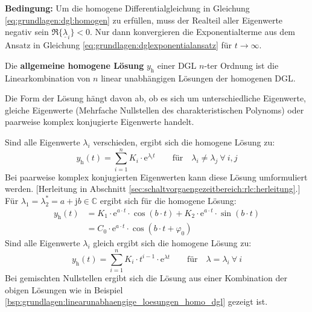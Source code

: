 \begin{frame}
{    %
    \textbf{Bedingung:} Um die homogene Differentialgleichung in Gleichung \ref{eq:grundlagen:dgl:homogen} 
    zu erfüllen, muss der Realteil aller Eigenwerte negativ sein $\Re\{\underline{\lambda}_i\}<0$. 
    Nur dann konvergieren die Exponentialterme aus dem Ansatz in Gleichung \ref{eq:grundlagen:dglexponentialansatz}
    für $t \to \infty$.

    Die \textbf{allgemeine homogene Lösung} $y_{\mathrm{h}}$ einer DGL $n$-ter Ordnung ist die Linearkombination
    von $n$ linear unabhängigen Lösungen der homogenen DGL.

    Die Form der Lösung hängt davon ab, ob es sich um unterschiedliche Eigenwerte, gleiche Eigenwerte (Mehrfache Nullstellen des charakteristischen Polynoms) 
    oder paarweise komplex konjugierte Eigenwerte handelt.

    Sind alle Eigenwerte $\lambda_i$ verschieden, ergibt sich die homogene Lösung zu:
    \begin{equation}\label{eq:grundlagen:homogeneloesung:lambdaungleich}
        y_{\mathrm{h}}(t) = \sum_{i=1}^{n} K_i \cdot \mathrm{e}^{\lambda_i t} \qquad \text{für} \quad \lambda_i \neq \lambda_j \ \forall \ i,j
    \end{equation}
    Bei paarweise komplex konjugierten Eigenwerten kann diese Lösung umformuliert werden. [Herleitung in Abschnitt \ref{sec:schaltvorgaengezeitbereich:rlc:herleitung}.]
    Für $\lambda_1 = \lambda_2^* = a + \mathrm{j} b \in \mathbb{C}$ ergibt sich für die homogene Lösung:
    \begin{equation}\label{eq:grundlagen:homogeneloesung:lambdakomplex}
        \begin{aligned}
        y_{\mathrm{h}}(t) &= K_1 \cdot \mathrm{e}^{a \cdot t} \cdot \cos(b \cdot t) + K_2 \cdot \mathrm{e}^{a \cdot t} \cdot \sin(b \cdot t) \\
        &= C_0 \cdot \mathrm{e}^{a \cdot t} \cdot \cos(b \cdot t + \varphi_0)
        \end{aligned}
    \end{equation}
    Sind alle Eigenwerte $\lambda_i$ gleich ergibt sich die homogene Lösung zu:
    \begin{equation}\label{eq:grundlagen:homogeneloesung:lambdagleich}
        y_{\mathrm{h}}(t) = \sum_{i=1}^{n} K_i \cdot t^{i-1}  \cdot \mathrm{e}^{\lambda t} \qquad \text{für} \quad \lambda = \lambda_i \ \forall \ i
    \end{equation}
    Bei gemischten Nullstellen ergibt sich die Lösung aus einer Kombination der obigen Lösungen wie in
    Beispiel \ref{bsp:grundlagen:linearunabhaengige_loesungen_homo_dgl} gezeigt ist.

}
\end{frame}
